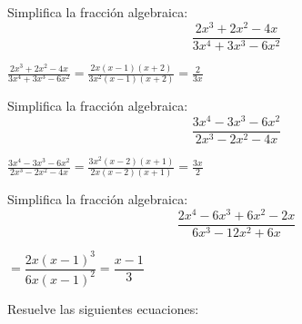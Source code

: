 \documentclass[addpoints,spanish, 12pt,a4paper]{exam}
\begin{document}
\begin{questions}
\question[1] Simplifica la fracción algebraica: $$\frac{2 x^{3} + 2 x^{2} - 4 x}{3 x^{4} + 3 x^{3} - 6 x^{2}}$$
\begin{solution} $\frac{2 x^{3} + 2 x^{2} - 4 x}{3 x^{4} + 3 x^{3} - 6 x^{2}}=\frac{2 x \left(x - 1\right) \left(x + 2\right)}{3 x^{2} \left(x - 1\right) \left(x + 2\right)}=\frac{2}{3 x}$  \end{solution}

\question[1] Simplifica la fracción algebraica: $$\frac{3 x^{4} - 3 x^{3} - 6 x^{2}}{2 x^{3} - 2 x^{2} - 4 x}$$
\begin{solution} $\frac{3 x^{4} - 3 x^{3} - 6 x^{2}}{2 x^{3} - 2 x^{2} - 4 x}=\frac{3 x^{2} \left(x - 2\right) \left(x + 1\right)}{2 x \left(x - 2\right) \left(x + 1\right)}=\frac{3 x}{2}$  \end{solution}

\addpoints

\question[1] Simplifica la fracción algebraica: $$\dfrac{2x^4-6x^3+6x^2-2x}{6x^3-12x^2+6x} $$
\begin{solution}$=\dfrac{2x\left(x-1\right)^3}{6x\left(x-1\right)^2}=\dfrac{x-1}{3}$ \end{solution}

\addpoints

\question Resuelve las siguientes ecuaciones: 
\end{questions}
\end{document}
